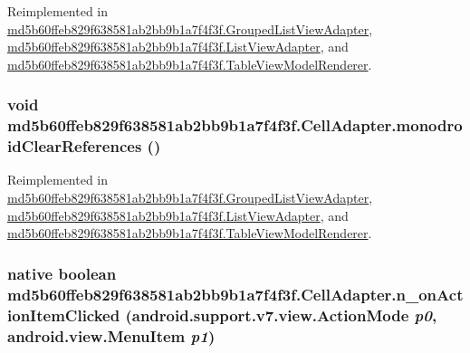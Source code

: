 Reimplemented in \hyperlink{classmd5b60ffeb829f638581ab2bb9b1a7f4f3f_1_1_grouped_list_view_adapter_dbd6d6284566d262ab2a3d9a44e0f906}{md5b60ffeb829f638581ab2bb9b1a7f4f3f.GroupedListViewAdapter}, \hyperlink{classmd5b60ffeb829f638581ab2bb9b1a7f4f3f_1_1_list_view_adapter_1325a463fbf8e693412780668a9e9a7e}{md5b60ffeb829f638581ab2bb9b1a7f4f3f.ListViewAdapter}, and \hyperlink{classmd5b60ffeb829f638581ab2bb9b1a7f4f3f_1_1_table_view_model_renderer_f694d5eaa766065b71fdc6e4204b904d}{md5b60ffeb829f638581ab2bb9b1a7f4f3f.TableViewModelRenderer}.\hypertarget{classmd5b60ffeb829f638581ab2bb9b1a7f4f3f_1_1_cell_adapter_ad3dc816719d492f2fa5de60860e45e7}{
\subsubsection[{monodroidClearReferences}]{\setlength{\rightskip}{0pt plus 5cm}void md5b60ffeb829f638581ab2bb9b1a7f4f3f.CellAdapter.monodroidClearReferences ()}}
\label{classmd5b60ffeb829f638581ab2bb9b1a7f4f3f_1_1_cell_adapter_ad3dc816719d492f2fa5de60860e45e7}




Reimplemented in \hyperlink{classmd5b60ffeb829f638581ab2bb9b1a7f4f3f_1_1_grouped_list_view_adapter_4634afbff45178960582fdfba5d55008}{md5b60ffeb829f638581ab2bb9b1a7f4f3f.GroupedListViewAdapter}, \hyperlink{classmd5b60ffeb829f638581ab2bb9b1a7f4f3f_1_1_list_view_adapter_92941f5776f2c562a319f8c0cce9f2a4}{md5b60ffeb829f638581ab2bb9b1a7f4f3f.ListViewAdapter}, and \hyperlink{classmd5b60ffeb829f638581ab2bb9b1a7f4f3f_1_1_table_view_model_renderer_92f10ed6c4706c14be7fcc1b40449cb2}{md5b60ffeb829f638581ab2bb9b1a7f4f3f.TableViewModelRenderer}.\hypertarget{classmd5b60ffeb829f638581ab2bb9b1a7f4f3f_1_1_cell_adapter_671a301aea8b82bb20f32bfd1147767f}{
\subsubsection[{n\_\-onActionItemClicked}]{\setlength{\rightskip}{0pt plus 5cm}native boolean md5b60ffeb829f638581ab2bb9b1a7f4f3f.CellAdapter.n\_\-onActionItemClicked (android.support.v7.view.ActionMode {\em p0}, \/  android.view.MenuItem {\em p1})}}
\label{classmd5b60ffeb829f638581ab2bb9b1a7f4f3f_1_1_cell_adapter_671a301aea8b82bb20f32bfd1147767f}


